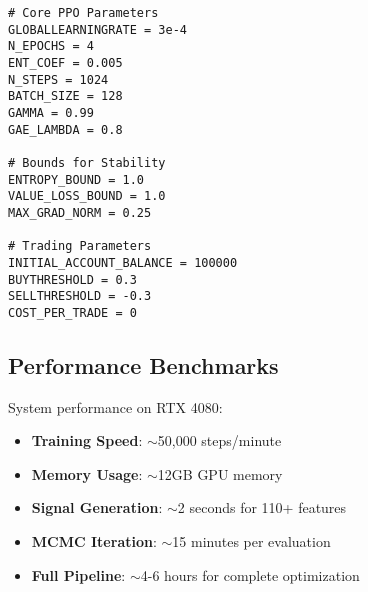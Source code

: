 \documentclass[11pt,a4paper]{article}
\begin{document}
\begin{lstlisting}
# Core PPO Parameters
GLOBALLEARNINGRATE = 3e-4
N_EPOCHS = 4
ENT_COEF = 0.005
N_STEPS = 1024
BATCH_SIZE = 128
GAMMA = 0.99
GAE_LAMBDA = 0.8

# Bounds for Stability
ENTROPY_BOUND = 1.0
VALUE_LOSS_BOUND = 1.0
MAX_GRAD_NORM = 0.25

# Trading Parameters
INITIAL_ACCOUNT_BALANCE = 100000
BUYTHRESHOLD = 0.3
SELLTHRESHOLD = -0.3
COST_PER_TRADE = 0
\end{lstlisting}

\subsection{Performance Benchmarks}

System performance on RTX 4080:
\begin{itemize}
    \item \textbf{Training Speed}: $\sim$50,000 steps/minute
    \item \textbf{Memory Usage}: $\sim$12GB GPU memory
    \item \textbf{Signal Generation}: $\sim$2 seconds for 110+ features
    \item \textbf{MCMC Iteration}: $\sim$15 minutes per evaluation
    \item \textbf{Full Pipeline}: $\sim$4-6 hours for complete optimization
\end{itemize}
\end{document}
